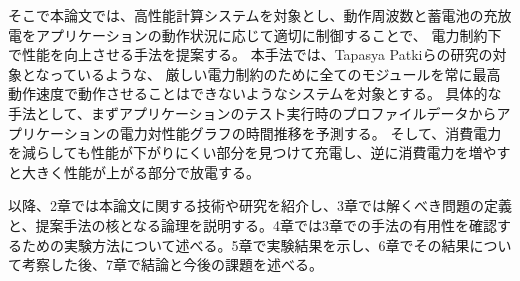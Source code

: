 そこで本論文では、高性能計算システムを対象とし、動作周波数と蓄電池の充放電をアプリケーションの動作状況に応じて適切に制御することで、
電力制約下で性能を向上させる手法を提案する。
本手法では、Tapasya Patkiらの研究\cite{Patki:2013:EHO:2464996.2465009}の対象となっているような、
厳しい電力制約のために全てのモジュールを常に最高動作速度で動作させることはできないようなシステムを対象とする。
具体的な手法として、まずアプリケーションのテスト実行時のプロファイルデータからアプリケーションの電力対性能グラフの時間推移を予測する。
そして、消費電力を減らしても性能が下がりにくい部分を見つけて充電し、逆に消費電力を増やすと大きく性能が上がる部分で放電する。


以降、2章では本論文に関する技術や研究を紹介し、3章では解くべき問題の定義と、提案手法の核となる論理を説明する。4章では3章での手法の有用性を確認するための実験方法について述べる。5章で実験結果を示し、6章でその結果について考察した後、7章で結論と今後の課題を述べる。







